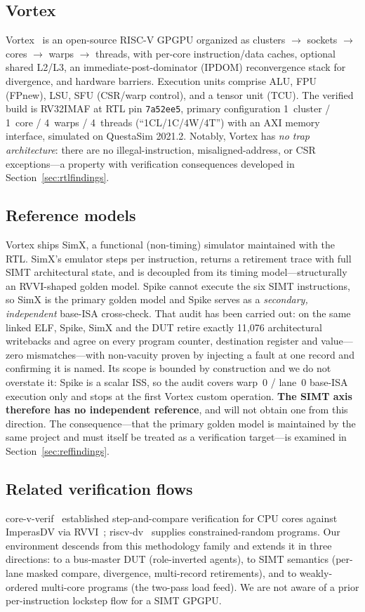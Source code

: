 \documentclass[conference]{IEEEtran}
\newcommand{\code}[1]{\texttt{\small #1}}
\begin{document}
\subsection{Vortex}
Vortex~\cite{vortex-micro,vortex-carrv} is an open-source RISC-V GPGPU
organized as clusters $\to$ sockets $\to$ cores $\to$ warps $\to$
threads, with per-core instruction/data caches, optional shared L2/L3,
an immediate-post-dominator (IPDOM) reconvergence stack for divergence,
and hardware barriers. Execution units
comprise ALU, FPU (FPnew), LSU, SFU (CSR/warp control), and a tensor
unit (TCU). The verified build is RV32IMAF at RTL pin \code{7a52ee5},
primary configuration 1~cluster / 1~core / 4~warps / 4~threads
(``1CL/1C/4W/4T'') with an AXI memory interface, simulated on
QuestaSim 2021.2. Notably, Vortex has \emph{no trap architecture}: there
are no illegal-instruction, misaligned-address, or CSR exceptions---a
property with verification consequences developed in
Section~\ref{sec:rtlfindings}.

\subsection{Reference models}
Vortex ships SimX, a functional (non-timing) simulator maintained with
the RTL. SimX's emulator steps per instruction, returns a retirement
trace with full SIMT architectural state, and is decoupled from its
timing model---structurally an RVVI-shaped golden model. Spike cannot
execute the six SIMT instructions, so SimX is the primary golden model
and Spike serves as a \emph{secondary, independent} base-ISA
cross-check. That audit has been carried out: on the same linked ELF,
Spike, SimX and the DUT retire exactly 11{,}076 architectural
writebacks and agree on every program counter, destination register and
value---zero mismatches---with non-vacuity proven by injecting a fault
at one record and confirming it is named. Its scope is bounded by
construction and we do not overstate it: Spike is a scalar ISS, so the
audit covers warp~0 / lane~0 base-ISA execution only and stops at the
first Vortex custom operation. \textbf{The SIMT axis therefore has no
independent reference}, and will not obtain one from this direction.
The consequence---that the primary golden model is maintained by the
same project and must itself be treated as a verification target---is
examined in Section~\ref{sec:reffindings}.

\subsection{Related verification flows}
core-v-verif~\cite{corevverif} established step-and-compare
verification for CPU cores against ImperasDV via RVVI~\cite{rvvi};
riscv-dv~\cite{riscvdv} supplies constrained-random programs. Our
environment descends from this methodology family and extends it in
three directions: to a bus-master DUT (role-inverted agents), to SIMT
semantics (per-lane masked compare, divergence, multi-record
retirements), and to weakly-ordered multi-core programs (the two-pass
load feed). We are not aware of a prior per-instruction lockstep flow
for a SIMT GPGPU.
\end{document}
